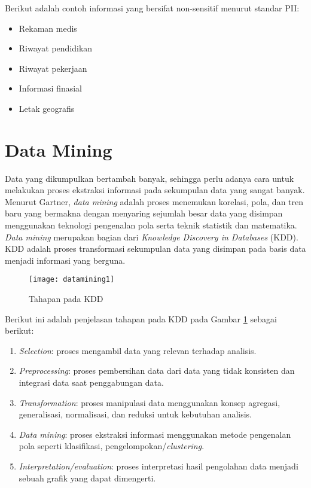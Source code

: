 \noindent Berikut adalah contoh informasi yang bersifat non-sensitif menurut standar PII:
\begin{itemize}
\item Rekaman medis
\item Riwayat pendidikan
\item Riwayat pekerjaan 
\item Informasi finasial
\item Letak geografis
\end{itemize}

\section{Data Mining}
Data yang dikumpulkan bertambah banyak, sehingga perlu adanya cara untuk melakukan proses ekstraksi informasi pada sekumpulan data yang sangat banyak. Menurut Gartner, \textit{data mining} adalah proses menemukan korelasi, pola, dan tren baru yang bermakna dengan menyaring sejumlah besar data yang disimpan menggunakan teknologi pengenalan pola serta teknik statistik dan matematika. \textit{Data mining} merupakan bagian dari \textit{Knowledge Discovery in Databases} (KDD). KDD adalah proses transformasi sekumpulan data yang disimpan pada basis data menjadi informasi yang berguna.\\

\begin{figure}[H]
	\centering
	\texttt{[image: datamining1]}
	\caption{Tahapan pada KDD}
	\label{fig:datamining1}
\end{figure}

\noindent Berikut ini adalah penjelasan tahapan pada KDD pada Gambar \ref{fig:datamining1} sebagai berikut:

\begin{enumerate}
\item \textit{Selection}: proses mengambil data yang relevan terhadap analisis.
\item \textit{Preprocessing}: proses pembersihan data dari data yang tidak konsisten dan integrasi data saat penggabungan data.
\item \textit{Transformation}: proses manipulasi data menggunakan konsep agregasi, generalisasi, normalisasi, dan reduksi untuk kebutuhan analisis.
\item \textit{Data mining}: proses ekstraksi informasi menggunakan metode pengenalan pola seperti klasifikasi, pengelompokan/\textit{clustering}.
\item \textit{Interpretation/evaluation}: proses interpretasi hasil pengolahan data menjadi sebuah grafik yang dapat dimengerti.
\end{enumerate}



